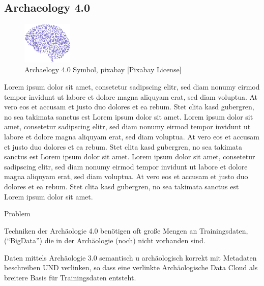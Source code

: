 \documentclass[twocolumn]{autart}
\begin{document}
\subsection{Archaeology 4.0}

\begin{figure}[!htb]
\begin{center}
\includegraphics[height=2cm]{a40.png}    %
\caption{Archaelogy 4.0 Symbol, pixabay [Pixabay License]}  %
\label{figa40symbol}                                 %
\end{center}                                 %
\end{figure}

Lorem ipsum dolor sit amet, consetetur sadipscing elitr, sed diam nonumy eirmod tempor invidunt ut labore et dolore magna aliquyam erat, sed diam voluptua. At vero eos et accusam et justo duo dolores et ea rebum. Stet clita kasd gubergren, no sea takimata sanctus est Lorem ipsum dolor sit amet. Lorem ipsum dolor sit amet, consetetur sadipscing elitr, sed diam nonumy eirmod tempor invidunt ut labore et dolore magna aliquyam erat, sed diam voluptua. At vero eos et accusam et justo duo dolores et ea rebum. Stet clita kasd gubergren, no sea takimata sanctus est Lorem ipsum dolor sit amet. Lorem ipsum dolor sit amet, consetetur sadipscing elitr, sed diam nonumy eirmod tempor invidunt ut labore et dolore magna aliquyam erat, sed diam voluptua. At vero eos et accusam et justo duo dolores et ea rebum. Stet clita kasd gubergren, no sea takimata sanctus est Lorem ipsum dolor sit amet. 

Problem 

Techniken der Archäologie
4.0 benötigen oft große
Mengen an Trainingsdaten,
(“BigData”) die in der
Archäologie (noch) nicht
vorhanden sind.

Daten mittels Archäologie 3.0
semantisch u archäologisch
korrekt mit Metadaten
beschreiben UND verlinken,
so dass eine verlinkte
Archäologische Data Cloud
als breitere Basis für
Trainingsdaten entsteht.

\cite{mccreary_computing}

\cite{hey_computing}
\end{document}
